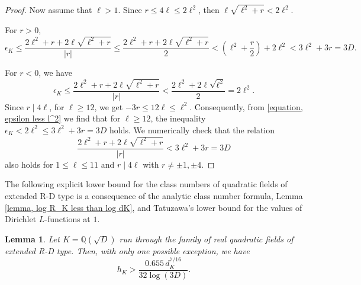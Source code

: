 \documentclass[12pt]{amsart}
\newtheorem{lemma}[theorem]{Lemma}
\theoremstyle{definition}
\numberwithin{equation}{section}
\begin{document}
\begin{proof}
Now assume that $\ell >1$. Since $r \leq 4 \ell \leq 2 \ell^2$, then $\ell \sqrt{\ell^2+r} <  2 \ell^2$.
 
 \noindent
For $r>0$,
 		\begin{equation*}
 			\epsilon_K \leq 	\frac{	2\ell^2+r + 2 \ell \sqrt{\ell^2+r}}{|r|} \leq 	\frac{	2\ell^2+r + 2 \ell \sqrt{\ell^2+r}}{2}  < \left(	\ell^2+ \frac{r}{2} \right) + 2 \ell^2 < 3 \ell^2 + 3r=3D.
 		\end{equation*}
 		
  \noindent
 	For $r <0$, we have
 			\begin{equation} \label{equation, epsilon less l^2}
 			\epsilon_K \leq 	\frac{	2\ell^2+r + 2 \ell \sqrt{\ell^2+r}}{|r|} <	\frac{	2\ell^2 + 2 \ell \sqrt{\ell^2}}{2}= 2\ell^2.
 		\end{equation}
 	Since $r \mid 4 \ell$, for $\ell \geq 12$, we get
 			$-3 r \leq 12 \ell \leq \ell^2.$
 		Consequently, from \eqref{equation, epsilon less l^2} we find that for $\ell \geq 12$, the inequality $\epsilon_K < 2 \ell^2 \leq 3 \ell^2+3r=3D$ holds.
 	We numerically check that the relation
 	\begin{equation*}
 		\frac{	2\ell^2+r + 2 \ell \sqrt{\ell^2+r}}{|r|} < 3 \ell^2+3r=3D
 	\end{equation*}
 	also holds for $1 \leq \ell \leq 11$ and $r \mid 4 \ell$ with $r \neq \pm 1, \pm 4$.
 \end{proof}
 
 
The following explicit lower bound for the class numbers of quadratic fields of extended R-D type is a consequence of the analytic class number formula, Lemma \ref{lemma, log R_K less than log dK}, and Tatuzawa's lower bound \cite{Tatuzawa} for the values of Dirichlet $L$-functions at $1$. 

\begin{lemma} \label{lemma, lower bound RD}
	Let $K=\mathbb{Q}(\sqrt{D})$ run through the family of real quadratic fields of extended R-D type. Then, with only one possible exception, we have
	\begin{equation} \label{equation, lower bound for hK of E-R-D type}
		h_K > \frac{0.655 \, d_K^{7/16}}{32 \log (3D)}.
	\end{equation}


\end{lemma}
\end{document}
